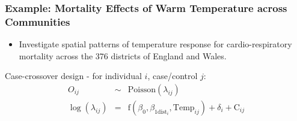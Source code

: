 \documentclass[slidestop,compress,serif,10pt]{beamer}
\begin{document}
\begin{frame}
\frametitle{Example: Mortality Effects of Warm Temperature across Communities}
%
%  
%
%
\begin{itemize}
\item Investigate spatial patterns of temperature response for cardio-respiratory mortality across the 376 districts of England and Wales.
\end{itemize}  
Case-crossover design - for individual $i$, case/control $j$:
\begin{eqnarray*}
  O_{ij}&\sim& \text{Poisson}(\lambda_{ij})\\
  \log(\lambda_{ij}) &= &\text{f}(\beta_{0}, \beta_{1\text{dist}_i}, \text{Temp}_{ij}) + \delta_i + \text{C}_{ij}
\end{eqnarray*}


\end{frame}
\end{document}
